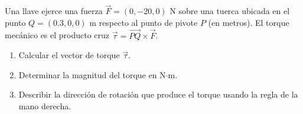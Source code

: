 Una llave ejerce una fuerza $\vec{F} = (0, -20, 0)$ N sobre una tuerca ubicada en el punto $Q = (0.3, 0, 0)$ m respecto al punto de pivote $P$ (en metros). El torque mecánico es el producto cruz $\vec{\tau} = \overrightarrow{PQ} \times \vec{F}$.
\begin{enumerate}
    \item Calcular el vector de torque $\vec{\tau}$.
    \item Determinar la magnitud del torque en N$\cdot$m.
    \item Describir la dirección de rotación que produce el torque usando la regla de la mano derecha.
\end{enumerate}
\begin{center}
\begin{minipage}{.9\textwidth}
\centering
\begingroup\shorthandoff{>}
\def\manoPrimero{\overrightarrow{PQ}}\def\manoSegundo{\vec F}\def\manoResultado{\vec\tau}

\endgroup
\end{minipage}
\end{center}
